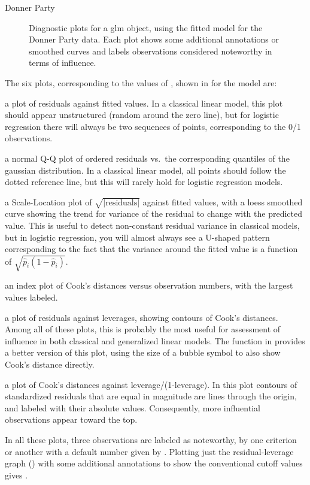 \documentclass[11pt]{book}\usepackage[]{graphicx}\usepackage[]{color}
\newenvironment{knitrout}{}{} %
\renewenvironment{knitrout}{\small\renewcommand{\baselinestretch}{.85}}{} %
\begin{document}
\begin{Example}[donner2]{Donner Party}
\begin{knitrout}
\begin{figure}[!htbp]
\caption[Diagnostic plots for a glm object, using the fitted model donner.mod3 for the Donner Party data.]{Diagnostic plots for a glm object, using the fitted model  for the Donner Party data. Each plot shows some additional annotations or smoothed curves and labels observations considered noteworthy in terms of influence.\label{fig:donner2-plot}}
\end{figure}


\end{knitrout}
The six plots, corresponding to the values of , shown in  for the  model are:
\begin{enumerate*}
\item a plot of residuals against fitted values.  In a classical linear model, this plot
should appear unstructured (random around the zero line), but for logistic regression
there will always be two sequences of points, corresponding to the 0/1 observations.
\item a normal Q-Q plot of ordered residuals vs.\ the corresponding quantiles of the gaussian distribution. In a classical linear model, all points should follow the dotted reference line,
but this will rarely hold for logistic regression models.
\item a Scale-Location plot of $\sqrt{|\mbox{residuals}|}$ against fitted values,
with a loess smoothed curve showing the trend for variance of the residual to
change with the predicted value.  This is useful to detect non-constant residual
variance in classical models, but in logistic regression, you will almost always
see a U-shaped pattern corresponding to the fact that the variance around the
fitted value is a function of $\sqrt{\hat{p}_i (1-\hat{p}_i)} $.
\item an index plot of Cook's distances versus observation numbers, with the largest  values labeled. 
\item a plot of residuals against leverages, showing contours of Cook's distances.  
Among all of these plots, this is probably the most useful for assessment of
influence in both classical and generalized linear models.  The function
 in  provides a better version of this plot,
using the size of a bubble symbol to also show Cook's distance directly.
\item a plot of Cook's distances against leverage/(1-leverage).
In this plot contours of standardized residuals that are equal in magnitude are lines through the origin,
and labeled with their absolute values. Consequently, more influential observations appear toward the top.
\end{enumerate*}
In all these plots, three observations are labeled as noteworthy, by one criterion or another
with a default number given by . Plotting just the residual-leverage graph
() with some additional annotations to show the conventional cutoff values
gives .


\end{Example}
\end{document}
